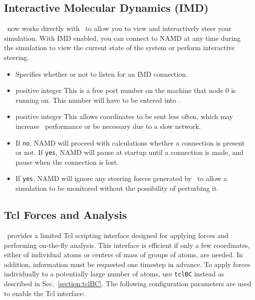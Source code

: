 \subsection{Interactive Molecular Dynamics (IMD)}

\NAMD\ now works directly with \VMD\ to allow you to view and interactively
steer your simulation.  With IMD enabled, you can connect to NAMD at any
time during the simulation to view the current state of the system or perform
interactive steering. 

\begin{itemize}
\item
{}
{Specifies whether or not to listen for an IMD connection.}

\item
{}
{positive integer}
{This is a free port number on the machine that node 0 is running on.
This number will have to be entered into \VMD.}

\item
{}
{positive integer}
{This allows coordinates to be sent less often, which may increase
\NAMD\ performance or be necessary due to a slow network.}

\item 
{}
{If {\tt no}, NAMD will proceed with calculations whether a connection is
present or not.  If {\tt yes}, NAMD will pause at startup until a connection is
made, and pause when the connection is lost.}

\item 
{}
{If {\tt yes}, NAMD will ignore any steering forces generated by \VMD\ to allow
a simulation to be monitored without the possibility of perturbing it.}

\end{itemize}


\subsection{Tcl Forces and Analysis}

\NAMD\ provides a limited Tcl scripting interface designed for applying forces and performing on-the-fly analysis.
This interface is efficient if only a few coordinates, either of individual atoms or centers of mass of groups of atoms, are needed.
In addition, information must be requested one timestep in advance.
To apply forces individually to a potentially large number of atoms, use
{\tt tclBC} instead as described in Sec.~\ref{section:tclBC}.
The following configuration parameters are used to enable the Tcl interface:

